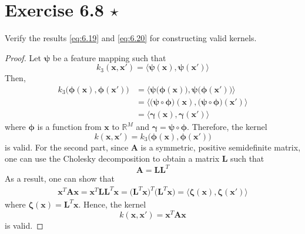 \section*{Exercise 6.8 $\star$}
Verify the results \eqref{eq:6.19} and \eqref{eq:6.20} for constructing valid kernels.

\vspace{1em}

\begin{proof}
    Let $\bm{\psi}$ be a feature mapping such that
    \[
        k_3(\mathbf{x}, \mathbf{x}') 
        = \langle \bm{\psi}(\mathbf{x}), \bm{\psi}(\mathbf{x}') \rangle
    \] 
    Then,
    \begin{align*}
        k_3\big(\bm{\phi}(\mathbf{x}), \bm{\phi}(\mathbf{x}')\big)
        &= \langle \bm{\psi}\big(\bm{\phi}(\mathbf{x})\big),
            \bm{\psi}\big(\bm{\phi}(\mathbf{x}')\big)\rangle \\
        &= \langle \big(\bm{\psi} \circ \bm{\phi}\big)(\mathbf{x}),
            \big(\bm{\psi} \circ \bm{\phi}\big)(\mathbf{x}')\rangle \\
        &= \langle \bm{\gamma}(\mathbf{x}), \bm{\gamma}(\mathbf{x}')\rangle
    \end{align*}
    where $\bm{\phi}$ is a function from $\mathbf{x}$ to $\mathbb{R}^M$ and
    $\bm{\gamma} = \bm{\psi} \circ \bm{\phi}$. Therefore, the kernel
    \begin{equation}\label{eq:6.19}\tag{6.19} 
        k(\mathbf{x}, \mathbf{x}') = k_3\big(\bm{\phi}(\mathbf{x}),
        \bm{\phi}(\mathbf{x}')\big)
    \end{equation}
    is valid. For the second part, since $\mathbf{A}$ is a 
    symmetric, positive semidefinite matrix, one can use the Cholesky
    decomposition to obtain a matrix $\mathbf{L}$ such that
    \[
        \mathbf{A} = \mathbf{L} \mathbf{L}^T
    \] 
    As a result, one can show that
    \begin{align*}
        \mathbf{x}^T \mathbf{A} \mathbf{x}
        = \mathbf{x}^T \mathbf{L} \mathbf{L}^T \mathbf{x}
        = \big(\mathbf{L}^T \mathbf{x}\big)^T \big(\mathbf{L}^T \mathbf{x}\big)
        = \langle \bm{\zeta}(\mathbf{x}), \bm{\zeta}(\mathbf{x}') \rangle
    \end{align*}
    where $\bm{\zeta}(\mathbf{x}) = \mathbf{L}^T \mathbf{x}$.
    Hence, the kernel
    \begin{equation}\label{eq:6.20}\tag{6.20}
        k(\mathbf{x}, \mathbf{x}') = \mathbf{x}^T \mathbf{A} \mathbf{x}
    \end{equation}
    is valid.
\end{proof} 

